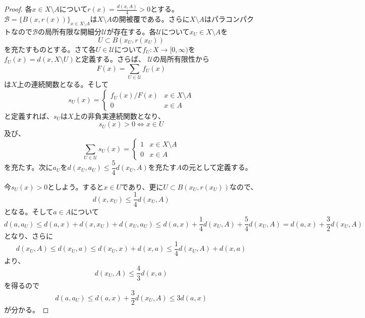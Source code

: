 \documentclass[leqno]{jsarticle}
\newcommand{\mgn}{\infty}
\newcommand{\dpst}{\displaystyle}
\begin{document}
\begin{proof}
各$x\in X\setminus A$について$\dpst r(x)=\frac{d(x,A)}{4}>0$とする。
$\mathcal{B}=\dpst \{B(x,r(x))\}_{x\in X\setminus A}$は$X\setminus A$の開被覆である。さらに$X\setminus A$はパラコンパクトなので$\mathcal{B}$の局所有限な開細分$\mathcal{U}$が存在する。各$\mathcal{U}$について$x_U\in X\setminus A$を
\[
U\subset B(x_U, r(x_U))
\]
を充たすものとする。さて各$U\in \mathcal{U}$について$f_U:X\to [0,\mgn)$を$f_U(x)=d(x,X\setminus U)$と定義する。さらば、
$\mathcal{U}$の局所有限性から
\[
F(x)=\sum_{U\in\mathcal{U}}f_U(x)
\]
は$X$上の連続関数となる。そして
\[
s_U(x)=\begin{cases}
		f_U(x)/F(x) & \text{$x\in X\setminus A$}\\
		0 & \text{$x\in A$}
	\end{cases}
\]
と定義すれば、$s_U$は$X$上の非負実連続関数となり、
\[
s_U(x)>0\iff x\in U
\]
及び、
\[
\sum_{U\in \mathcal{U}}s_U(x)=
\begin{cases}
		1 & \text{$x\in X\setminus A$}\\
		0 & \text{$x\in A$}
\end{cases}
\]
を充たす。次に$a_U$を$d(x_U,a_U)\le \dfrac{5}{4}d(x_U,A)$を充たす$A$の元として定義する。\par
今$s_U(x)>0$としよう。すると$x\in U$であり、更に$U\subset B(x_U, r(x_U))$なので、
\[
d(x,x_U)\le \frac{1}{4}d(x_U,A)
\]
となる。そして$a\in A$について
\[
d(a,a_U)\le d(a, x)+d(x,x_U)+d(x_U,a_U)\le d(a,x)+\frac{1}{4}d(x_U,A)+\frac{5}{4}d(x_U,A)=d(a,x)+\frac{3}{2}d(x_U,A)
\]
となり、さらに
\[
d(x_U,A)\le d(x_U,a)\le d(x_U,x)+d(x,a)\le \frac{1}{4}d(x_U,A)+d(x,a)
\]
より、
\[
d(x_U,A)\le \frac{4}{3}d(x,a)
\]
を得るので
\[
d(a,a_U)\le d(a,x)+\frac{3}{2}d(x_U,A)\le 3d(a,x)
\]
が分かる。
\end{proof}
\end{document}
